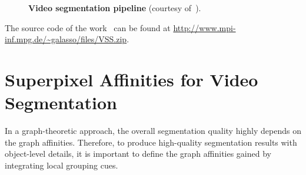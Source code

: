 \begin{figure}[t]
\centering
{}
{}
{}
{}
{}
\caption[Video segmentation pipeline]{
{\bf Video segmentation pipeline} (courtesy of~\cite{GalassoCS12}).} %
\label{fig:seg_example}
\end{figure}
The source code of the work~\cite{GalassoCS12} can be found at \url{http://www.mpi-inf.mpg.de/~galasso/files/VSS.zip}.
\section{Superpixel Affinities for Video Segmentation}
\label{sec:ch3_affinities}
In a graph-theoretic approach, the overall segmentation quality highly depends on the graph affinities. Therefore, to produce high-quality segmentation results with object-level details, 
it is important to define the graph affinities gained by integrating local grouping cues.

